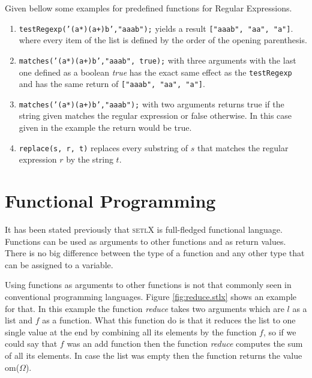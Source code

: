 \documentclass[11pt]{report}
\begin{document}
Given bellow some examples for predefined functions for Regular Expressions.
\begin{enumerate}
\item \texttt{testRegexp('(a*)(a+)b',"aaab");} yields a result \texttt{["aaab", "aa", "a"]}. where every item of the list is defined by the order of the opening parenthesis.
\item \texttt{matches('(a*)(a+)b',"aaab", true);} with three arguments with the last one defined as a boolean \textsl{true} has the exact same effect as the \texttt{testRegexp} and has the same return of \texttt{["aaab", "aa", "a"]}.
\item \texttt{matches('(a*)(a+)b',"aaab");} with two arguments returns true if the string given matches the regular expression or false otherwise. In this case given in the example the return would be true.
\item \texttt{replace(s, r, t)} replaces every substring of $s$ that matches the regular expression $r$ by the string $t$.
\end{enumerate}


\section{Functional Programming}
It has been stated previously that \textsc{setlX} is full-fledged functional language. Functions can be used as arguments to other functions and as return values. There is no big difference between the type of a function and any other type that can be assigned to a variable.

Using functions as arguments to other functions is not that commonly seen in conventional programming languages. Figure \ref{fig:reduce.stlx} shows an example for that. In this example the function \textsl{reduce} takes two arguments which are $l$ as a list and $f$ as a function. What this function do is that it reduces the list to one single value at the end by combining all its elements by the function $f$, so if we could say that $f$ was an add function then the function \textsl{reduce} computes the sum of all its elements. In case the list was empty then the function returns the value om($\Omega$).
\end{document}
